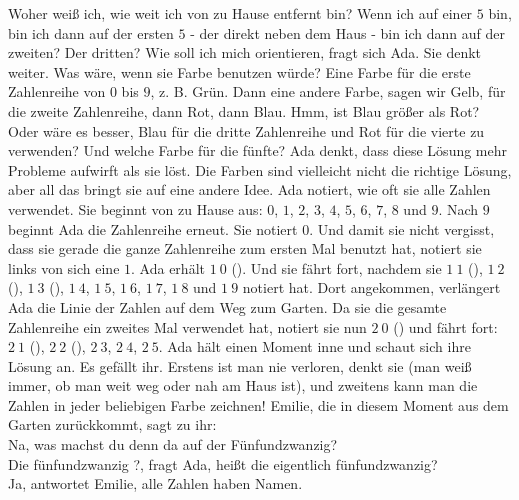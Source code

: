 Woher weiß ich, wie weit ich von zu Hause entfernt bin? Wenn ich auf einer $5$ bin, bin ich dann auf der ersten $5$ - der direkt neben dem Haus - bin ich dann auf der zweiten? Der dritten? Wie soll ich mich orientieren, fragt sich Ada.
Sie denkt weiter. Was wäre, wenn sie Farbe benutzen würde? 
Eine Farbe für die erste Zahlenreihe von $0$ bis $9$, z. B. Grün. Dann eine andere Farbe, sagen wir Gelb, für die zweite Zahlenreihe, dann Rot, dann Blau. Hmm, ist Blau größer als Rot? Oder wäre es besser, Blau für die dritte Zahlenreihe und Rot für die vierte zu verwenden? Und welche Farbe für die fünfte? Ada denkt, dass diese Lösung mehr Probleme aufwirft als sie löst.  
Die Farben sind vielleicht nicht die richtige Lösung, aber all das bringt sie auf eine andere Idee. Ada notiert, wie oft sie alle Zahlen verwendet. Sie beginnt von zu Hause aus: $0$, $1$, $2$, $3$, $4$, $5$, $6$, $7$, $8$ und $9$. Nach $9$ beginnt Ada die Zahlenreihe erneut. Sie notiert $0$. Und damit sie nicht vergisst, dass sie gerade die ganze Zahlenreihe zum ersten Mal benutzt hat, notiert sie links von sich eine $1$. Ada erhält $1~0$ (). Und sie fährt fort, nachdem sie $1~1$ (), $1~2$ (), $1~3$ (), $1~4$, $1~5$, $1~6$, $1~7$, $1~8$ und $1~9$ notiert hat. 
Dort angekommen, verlängert Ada die Linie der Zahlen auf dem Weg zum Garten. 
Da sie die gesamte Zahlenreihe ein zweites Mal verwendet hat, notiert sie nun $2~0$ () und fährt fort: $2~1$ (), $2~2$ (), $2~3$, $2~4$, $2~5$. 
Ada hält einen Moment inne und schaut sich ihre Lösung an. Es gefällt ihr. Erstens ist man nie verloren, denkt sie (man weiß immer, ob man weit weg oder nah am Haus ist), und zweitens kann man die Zahlen in jeder beliebigen Farbe zeichnen! 
Emilie, die in diesem Moment aus dem Garten zurückkommt, sagt zu ihr:\\
\frqq{}Na, was machst du denn da auf der Fünfundzwanzig?\flqq{}\\
\frqq{}Die fünfundzwanzig ?\flqq{}, fragt Ada, \frqq{}heißt die  eigentlich fünfundzwanzig?\flqq{}\\
\frqq{}Ja\flqq{}, antwortet Emilie, \frqq{}alle Zahlen haben Namen.\flqq{}\\

